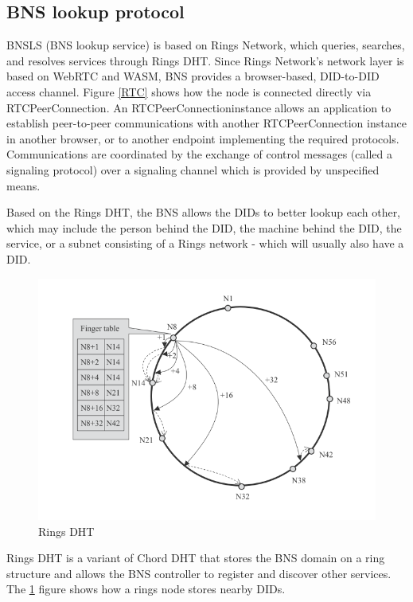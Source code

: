 \documentclass[twocolumn]{article}
\begin{document}
\subsection{BNS lookup protocol}

BNSLS (BNS lookup service) is based on Rings Network, which queries, searches, and resolves services through Rings DHT. Since Rings Network's network layer is based on WebRTC\cite{webrtc-standard} and WASM, BNS provides a browser-based, DID-to-DID access channel. Figure \ref{RTC} shows how the node is connected directly via RTCPeerConnection. An RTCPeerConnectioninstance allows an application to establish peer-to-peer communications with another RTCPeerConnection instance in another browser, or to another endpoint implementing the required protocols. Communications are coordinated by the exchange of control messages (called a signaling protocol) over a signaling channel which is provided by unspecified means.

Based on the Rings DHT, the BNS allows the DIDs to better lookup each other, which may include the person behind the DID, the machine behind the DID, the service, or a subnet consisting of a Rings network - which will usually also have a DID.
\begin{figure}[htbp]
  \includegraphics[width=\linewidth]{imgs/chord.png}
  \caption{Rings DHT}
  \label{chord}

  \end{figure}

Rings DHT is a variant of Chord DHT that stores the BNS domain on a ring structure and allows the BNS controller to register and discover other services. The \ref{chord} figure shows how a rings node stores nearby DIDs.
\end{document}
